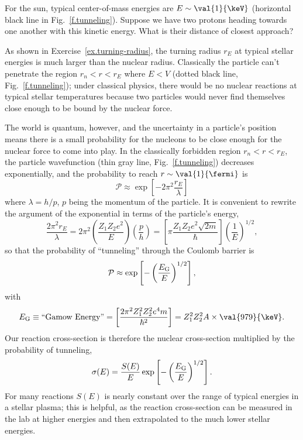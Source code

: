 \begin{exercisebox}
\label{ex.turning-radius}
For the sun, typical center-of-mass energies are $E \sim \val{1}{\keV}$ (horizontal black line in Fig.~\ref{f.tunneling}). Suppose we have two protons heading towards one another with this kinetic  energy. What is their distance of closest approach?
\end{exercisebox}

As shown in Exercise~\ref{ex.turning-radius}, the turning radius $r_{E}$ at typical stellar energies is much larger than the nuclear radius.  Classically the particle can't penetrate the region $r_{n} < r < r_{E}$ where $E < V$ (dotted black line, Fig.~\ref{f.tunneling}); under classical physics, there would be no nuclear reactions at typical stellar temperatures because two particles would never find themselves close enough to be bound by the nuclear force.

The world is quantum, however, and the uncertainty in a particle's position means there is a small probability for the nucleons to be close enough for the nuclear force to come into play. In the classically forbidden region $r_{n} < r < r_{E}$, the particle wavefunction (thin gray line, Fig.~\ref{f.tunneling}) decreases exponentially, and the probability to reach $r\sim\val{1}{\fermi}$ is
\[ \mathcal{P}\approx \exp\left[-2\pi^{2}\frac{r_{E}}{\lambda}\right] \]
where $\lambda = h/p$, $p$ being the momentum of the particle.
It is convenient to rewrite the argument of the exponential in terms of the particle's energy,
\[ \frac{2\pi^{2}r_{E}}{\lambda} = 2\pi^{2}\left(\frac{Z_{1}Z_{2}e^{2}}{E}\right)
	\left(\frac{p}{h}\right) = \left[\pi \frac{Z_{1}Z_{2}e^{2}\sqrt{2m}}{\hbar}\right]\left(\frac{1}{E}\right)^{1/2}, \]
so that the probability of ``tunneling'' through the Coulomb barrier is
\begin{equation}
\mathcal{P} \approx \exp\left[-\left(\frac{E_{\mathrm{G}}}{E}\right)^{1/2}\right],
\end{equation}
with
\[ \EG \equiv \textrm{``Gamow Energy''} = \left[\frac{2\pi^{2}Z_{1}^{2}Z_{2}^{2}e^{4}m}{\hbar^{2}}\right] = Z_{1}^{2}Z_{2}^{2}A \times \val{979}{\keV}.
\]
Our reaction cross-section is therefore the nuclear cross-section multiplied by the probability of tunneling, 
\begin{equation}\label{e.s-def}
\sigma(E) = \frac{S(E)}{E}\exp\left[-\left(\frac{E_{\mathrm{G}}}{E}\right)^{1/2}\right].
\end{equation}
For many reactions $S(E)$ is nearly constant over the range of typical energies in a stellar plasma; this is helpful, as the reaction cross-section can be measured in the lab at higher energies and then extrapolated to the much lower stellar energies.

